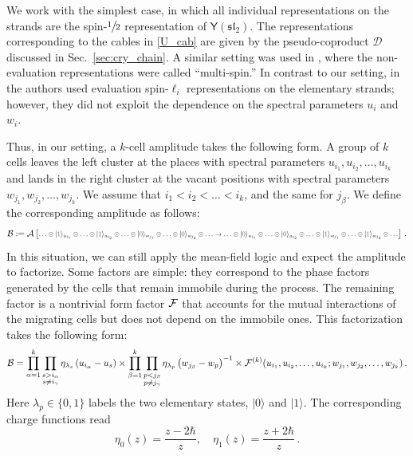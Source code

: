 \documentclass[10pt]{article}
\theoremstyle{definition}
\def\CA{{\cal A}}
\def\CB{{\cal B}}
\def\CF {{\cal F}}
\def\CB {{\cal B}}
\def\fl{\mathfrak{l}}
\def\fs{\mathfrak{s}}
\def\fs{\mathfrak{s}}
\def\myY{{\mathsf{Y}}}
\def\sD{{\mathscr{D}}}
\def\lm{\limits}
\numberwithin{equation}{section}
\begin{document}
We work with the simplest case, in which all individual representations on the strands are the spin-$\sfrac{1}{2}$ representation of $\myY(\fs\fl_2)$.
The representations corresponding to the cables in \eqref{U_cab} are given by the pseudo-coproduct $\sD$ discussed in Sec.~\ref{sec:cry_chain}.
A similar setting was used in \cite{Yang:2024hsp}, where the non-evaluation representations were called ``multi-spin.''
In contrast to our setting, in \cite{Yang:2024hsp} the authors used evaluation spin-$\ell_i$ representations on the elementary strands; however, they did not exploit the dependence on the spectral parameters $u_i$ and $w_i$.

Thus, in our setting, a $k$-cell amplitude takes the following form.
A group of $k$ cells leaves the left cluster at the places with spectral parameters $u_{i_1},u_{i_2},\ldots,u_{i_k}$ and lands in the right cluster at the vacant positions with spectral parameters $w_{j_1},w_{j_2},\ldots,w_{j_k}$.
We assume that $i_1<i_2<\ldots<i_k$, and the same for $j_\beta$.
We define the corresponding amplitude as follows:
\begin{equation}
	\CB:=\CA\left[\scalebox{0.8}{$\ldots\otimes|{\color{color1}1}\rangle_{u_{i_1}}\otimes\ldots\otimes |{\color{color1}1}\rangle_{u_{i_2}}\otimes\ldots\otimes|{\color{color3}0}\rangle_{w_{j_1}}\otimes\ldots\otimes|{\color{color3}0}\rangle_{w_{j_2}}\otimes \ldots\to \ldots\otimes|{\color{color3}0}\rangle_{u_{i_1}}\otimes\ldots\otimes |{\color{color3}0}\rangle_{u_{i_2}}\otimes\ldots\otimes|{\color{color1}1}\rangle_{w_{j_1}}\otimes\ldots\otimes|{\color{color1}1}\rangle_{w_{j_2}}\otimes \ldots$}\right]\,.
\end{equation}
In this situation, we can still apply the mean-field logic and expect the amplitude to factorize.
Some factors are simple: they correspond to the phase factors generated by the cells that remain immobile during the process.
The remaining factor is a nontrivial form factor $\CF$ that accounts for the mutual interactions of the migrating cells but does not depend on the immobile ones.
This factorization takes the following form:
\begin{equation}\label{chain_factor}
	\CB=\prod\lm_{\alpha=1}^k\prod\lm_{\substack{s>i_{\alpha}\\
	s\neq i_{\gamma}}}\eta_{\lambda_{s}}\left(u_{i_\alpha}-u_s\right)\times\prod\lm_{\beta=1}^k\prod\lm_{\substack{p<j_{\beta}\\
	p\neq j_{\gamma}}}\eta_{\lambda_{p}}\left(w_{j_\beta}-w_p\right)^{-1}\times\CF^{(k)}(u_{i_1},u_{i_2},\ldots, u_{i_k};w_{j_1},w_{j_2},\ldots, w_{j_k})\,.
\end{equation}
Here $\lambda_p\in\{0,1\}$ labels the two elementary states, $|0\rangle$ and $|1\rangle$.
The corresponding charge functions read
\begin{equation}
	\eta_0(z)=\frac{z-2\hbar}{z},\quad \eta_1(z)=\frac{z+2\hbar}{z}\,.
\end{equation}
\end{document}
